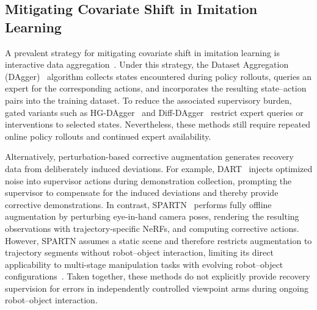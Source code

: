 \documentclass[letterpaper, 10 pt, conference]{ieeeconf}  %
\begin{document}
\subsection{Mitigating Covariate Shift in Imitation Learning}
A prevalent strategy for mitigating covariate shift in imitation learning is interactive data aggregation~\cite{spencerFeedbackImitationLearning2021}. Under this strategy, the Dataset Aggregation (DAgger)~\cite{rossReductionImitationLearning} algorithm collects states encountered during policy rollouts, queries an expert for the corresponding actions, and incorporates the resulting state--action pairs into the training dataset. To reduce the associated supervisory burden, gated variants such as HG-DAgger~\cite{kellyHGDAggerInteractiveImitation2019} and Diff-DAgger~\cite{leeDiffDAggerUncertaintyEstimation2025} restrict expert queries or interventions to selected states. Nevertheless, these methods still require repeated online policy rollouts and continued expert availability. 

Alternatively, perturbation-based corrective augmentation generates recovery data from deliberately induced deviations.
For example, DART~\cite{laskeyDARTNoiseInjection} injects optimized noise into supervisor actions during demonstration collection, prompting the supervisor to compensate for the induced deviations and thereby provide corrective demonstrations.
In contrast, SPARTN~\cite{zhouNeRFPalmYour2023a} performs fully offline augmentation by perturbing eye-in-hand camera poses, rendering the resulting observations with trajectory-specific NeRFs, and computing corrective actions. 
However, SPARTN assumes a static scene and therefore restricts augmentation to trajectory segments without robot--object interaction, limiting its direct applicability to multi-stage manipulation tasks with evolving robot--object configurations~\cite{zhouNeRFPalmYour2023a}. 
Taken together, these methods do not explicitly provide recovery supervision for errors in independently controlled viewpoint arms during ongoing robot--object interaction.

\end{document}
